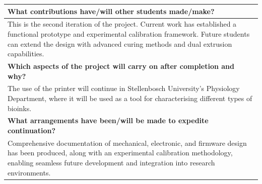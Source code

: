\begin{longtable}{|m{\textwidth}|}
\centering\textbf{\large What contributions have/will other students made/make?} \\
\hline    
This is the second iteration of the project. Current work has established a functional prototype and experimental calibration framework. Future students can extend the design with advanced curing methods and dual extrusion capabilities. \\
\hline 

\centering\textbf{\large Which aspects of the project will carry on after completion and why?} \\
\hline    
The use of the printer will continue in Stellenbosch University's Physiology Department, where it will be used as a tool for characterising different types of bioinks. \\
\hline    

\centering\textbf{\large What arrangements have been/will be made to expedite continuation?} \\
\hline    
Comprehensive documentation of mechanical, electronic, and firmware design has been produced, along with an experimental calibration methodology, enabling seamless future development and integration into research environments. \\
\hline    

\end{longtable}
